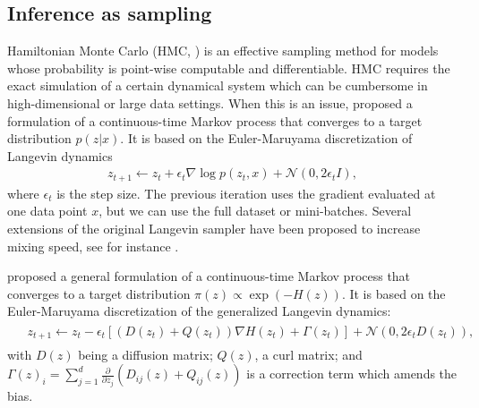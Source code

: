 \subsection{Inference as sampling}\label{sec:infassamp}

Hamiltonian Monte Carlo (HMC, \parencite{neal2011mcmc}) is an effective sampling method for models whose probability is point-wise computable and differentiable. %
HMC requires the exact simulation of a certain dynamical system which can be cumbersome in high-dimensional or large data settings. When this is an issue, \cite{welling2011bayesian} proposed a formulation of a continuous-time Markov process that converges to a target distribution $p({z} | {x})$. It is based on the Euler-Maruyama discretization of Langevin dynamics
\begin{eqnarray}\label{eq:sgld}
{z}_{t+1} \leftarrow {z}_{t} + \epsilon_t \nabla \log p({z}_t,{x})  + \mathcal{N}({0}, 2\epsilon_t I),
\end{eqnarray}
where $\epsilon_t$ is the step size. The previous iteration uses the gradient evaluated at one data point ${x}$, but we can use the full dataset or mini-batches. Several extensions of the original Langevin sampler have been proposed to increase mixing speed, see for instance \parencite{li2016preconditioned,li2016high,li2019communication}.

\cite{ma2015complete} proposed a general formulation of a continuous-time Markov process that converges to a target distribution $\pi({z}) \propto \exp (-H({z}))$. It is based on the Euler-Maruyama discretization of the generalized Langevin dynamics:
\begin{align}\label{eq:sgmcmc}
\begin{split}
&{z}_{t+1} \leftarrow {z}_{t}  -\epsilon_t \left[ ({D}({z}_t) + {Q}({z}_t)) \nabla H({z}_t) + {\Gamma}({z}_t) \right] + \mathcal{N}({0}, 2\epsilon_t {D}({z}_t)),
\end{split}
\end{align}
with ${D}({z})$ being a diffusion matrix; ${Q}({z})$, a curl matrix; and ${\Gamma}({z})_i = \sum_{j=1}^d \frac{\partial}{\partial {z}_j} ({D}_{ij}({z}) + {Q}_{ij}({z})) $ is a correction term which amends the bias.


